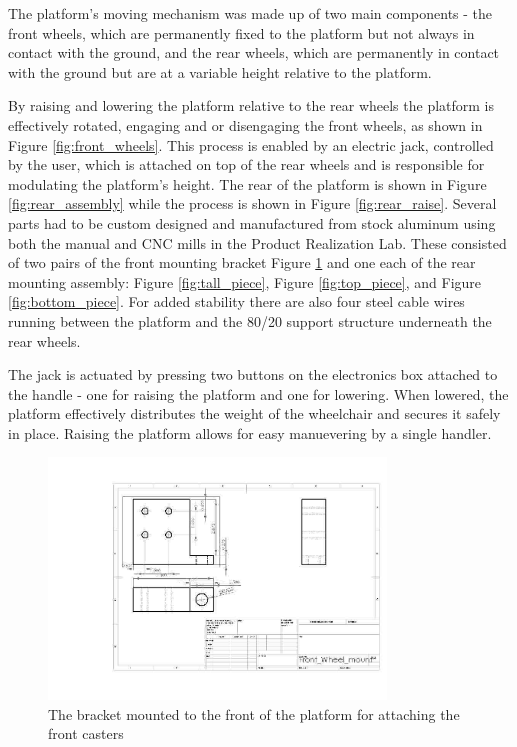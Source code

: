 The platform's moving mechanism was made up of two main components - the front wheels, which are permanently fixed to the platform but not always in contact with the ground, and the rear wheels, which are permanently in contact with the ground but are at a variable height relative to the platform.

By raising and lowering the platform relative to the rear wheels the platform is effectively rotated, engaging and or disengaging the front wheels, as shown in Figure \ref{fig:front_wheels}. This process is enabled by an electric jack, controlled by the user, which is attached on top of the rear wheels and is responsible for modulating the platform's height. The rear of the platform is shown in Figure \ref{fig:rear_assembly} while the process is shown in Figure \ref{fig:rear_raise}. Several parts had to be custom designed and manufactured from stock aluminum using both the manual and CNC mills in the Product Realization Lab. These consisted of two pairs of the front mounting bracket Figure \ref{fig:front_bracket} and one each of the rear mounting assembly: Figure \ref{fig:tall_piece}, Figure \ref{fig:top_piece}, and Figure \ref{fig:bottom_piece}. For added stability there are also four steel cable wires running between the platform and the 80/20 support structure underneath the rear wheels.

The jack is actuated by pressing two buttons on the electronics box attached to the handle - one for raising the platform and one for lowering. When lowered, the platform effectively distributes the weight of the wheelchair and secures it safely in place. Raising the platform allows for easy manuevering by a single handler.

\begin{figure}
\centering
 \includegraphics[width=0.8\textwidth]{images/Front_Wheel_mount}
\caption{The bracket mounted to the front of the platform for attaching the front casters}
\label{fig:front_bracket}
\end{figure}


